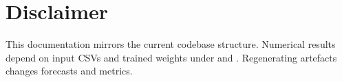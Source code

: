 \documentclass[11pt,a4paper]{article}
\begin{document}
\section*{Disclaimer}
This documentation mirrors the current codebase structure. Numerical results depend on input CSVs and trained weights under  and . Regenerating artefacts changes forecasts and metrics.
\end{document}

